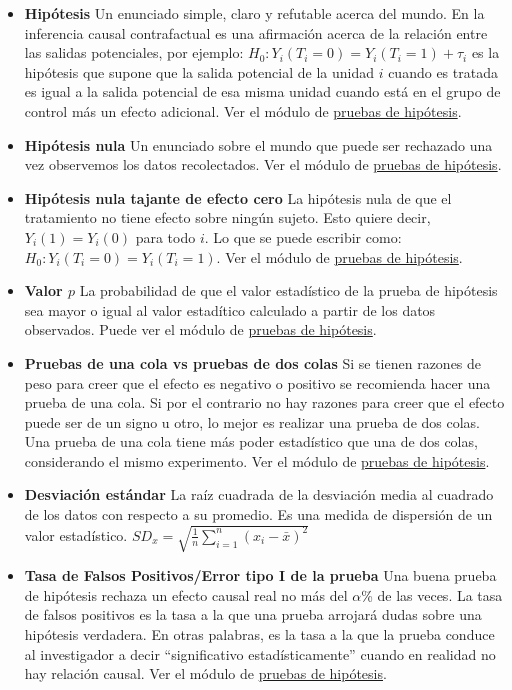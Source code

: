 \documentclass[
  12pt,
  spanish,
]{book}
\providecommand{\tightlist}{%
  \setlength{\itemsep}{0pt}\setlength{\parskip}{0pt}}
\begin{document}
\begin{itemize}
\tightlist
\item
  \textbf{Hipótesis} Un enunciado simple, claro y refutable acerca del mundo. En la inferencia causal contrafactual es una afirmación acerca de la relación entre las salidas potenciales, por ejemplo: \(H_0: Y_i(T_i=0) = Y_i(T_i=1) + \tau_i\) es la hipótesis que supone que la salida potencial de la unidad \(i\) cuando es tratada es igual a la
  salida potencial de esa misma unidad cuando está en el grupo de control más un efecto adicional. Ver el módulo de \href{pruebas-de-hipótesis.html}{pruebas de hipótesis}.
\item
  \textbf{Hipótesis nula} Un enunciado sobre el mundo que puede ser rechazado una vez observemos los datos recolectados. Ver el módulo de \href{pruebas-de-hipótesis.html}{pruebas de hipótesis}.
\item
  \textbf{Hipótesis nula tajante de efecto cero} La hipótesis nula de que el tratamiento no tiene efecto sobre ningún sujeto. Esto quiere decir, \(Y_i(1)=Y_i(0)\) para todo \(i\). Lo que se puede escribir como: \(H_0: Y_i(T_i=0) = Y_i(T_i=1)\). Ver el módulo de
  \href{pruebas-de-hipótesis.html}{pruebas de hipótesis}.
\item
  \textbf{Valor \(p\)} La probabilidad de que el valor estadístico de la prueba de hipótesis sea mayor o igual al valor estadítico calculado a partir de los datos observados. Puede ver el módulo de \href{pruebas-de-hipótesis.html}{pruebas de hipótesis}.
\item
  \textbf{Pruebas de una cola vs pruebas de dos colas} Si se tienen razones de peso para creer que el efecto es negativo o positivo se recomienda hacer una prueba de una cola.
  Si por el contrario no hay razones para creer que el efecto puede ser de un signo u otro, lo mejor es realizar una prueba de dos colas. Una prueba de una cola tiene más poder estadístico que una de dos colas, considerando el mismo experimento.
  Ver el módulo de \href{pruebas-de-hipótesis.html}{pruebas de hipótesis}.
\item
  \textbf{Desviación estándar} La raíz cuadrada de la desviación media al cuadrado de los datos con respecto a su promedio. Es una medida de dispersión de un valor estadístico.
  \(SD_x=\sqrt{\frac{1}{n}\sum_{i=1}^n(x_i-\bar{x})^2}\)
\item
  \textbf{Tasa de Falsos Positivos/Error tipo I de la prueba} Una buena prueba de hipótesis rechaza un efecto causal real no más del \(\alpha\)\% de las veces. La tasa de falsos positivos es la tasa a la que una prueba arrojará dudas sobre una hipótesis verdadera. En otras palabras, es la tasa a la que la prueba conduce al investigador a decir ``significativo estadísticamente'' cuando en realidad no hay relación causal. Ver el módulo de \href{pruebas-de-hipótesis.html}{pruebas de hipótesis}.

\end{itemize}
\end{document}
